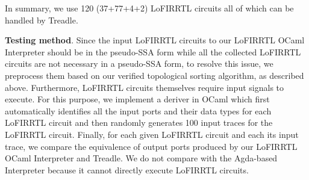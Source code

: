 In summary, we use 120 (37+77+4+2) LoFIRRTL circuits all of which can be handled by Treadle.

\smallskip\noindent
{\bf Testing method}.
Since the input LoFIRRTL circuits to our LoFIRRTL OCaml Interpreter should be in the pseudo-SSA form
while all the collected LoFIRRTL circuits are not necessary in a pseudo-SSA form,
to resolve this issue, we preprocess them based on our verified
topological sorting algorithm, as described above.
Furthermore, LoFIRRTL circuits themselves require input signals to execute.
For this purpose, we implement a deriver in OCaml which first automatically identifies
all the input ports and their data types for each LoFIRRTL circuit and then randomly generates 100 input traces for
the LoFIRRTL circuit. Finally, for each given LoFIRRTL circuit and each its input trace,
we compare the equivalence of output ports produced by our LoFIRRTL OCaml Interpreter and Treadle.
We do not compare with the Agda-based Interpreter because it cannot directly execute LoFIRRTL circuits.

\begin{table}[!t]
\caption{Results of conformance testing}\small %
\label{tab:conformancetesting}
\end{table}
 	 	 	


